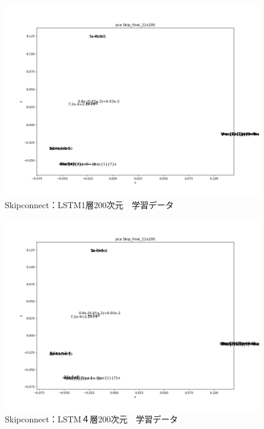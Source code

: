 \documentclass[a4j,11pt,report]{jsbook}
\begin{document}
\begin{center}
  \begin{figure}[tb]
    \centering
    \includegraphics[width=0.7\linewidth]{result/pca_formula_Skip_final_22x200_1_Wed_Feb_06_06:19:41.png}
    \caption{Skipconnect：LSTM1層200次元　学習データ}
    \label{fig:Skip4layer1}
  \end{figure}
\end{center}

\begin{center}
  \begin{figure}[tb]
    \centering
    \includegraphics[width=0.7\linewidth]{result/pca_formula_Skip_final_22x200_4_Wed_Feb_06_06:22:39.png}
    \caption{Skipconnect：LSTM４層200次元　学習データ}
    \label{fig:Skip4layer2}
  \end{figure}
\end{center}
\end{document}
